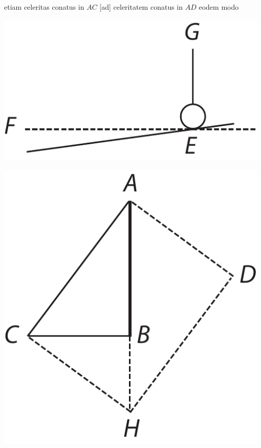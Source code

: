 etiam celeritas conatus\protect{} in $\displaystyle AC$
[ad]
celeritatem conatus in $\displaystyle AD$ eodem modo 
\pend
\pstart
\begin{minipage}[c]{0.32\textwidth}
\includegraphics[width=0.98\textwidth]{images/LH035,14,02_114r-d4.pdf}
\end{minipage}
\hspace*{26mm}
\begin{minipage}[c]{0.3\textwidth}
\hspace*{-5mm}
\includegraphics[width=0.98\textwidth]{images/LH035,14,02_114r-d5.pdf}
\end{minipage}
